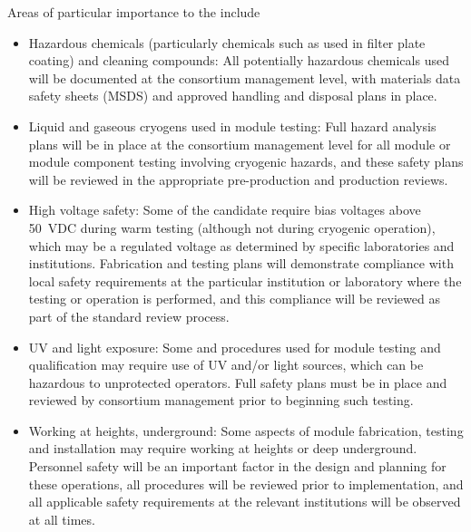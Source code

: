 Areas of particular importance to the  include
\begin{itemize}
\item Hazardous chemicals (particularly  chemicals such as  used in filter plate coating) and cleaning compounds:  All potentially hazardous chemicals used will be documented at the consortium management level, with materials data safety sheets (MSDS) and approved handling and disposal plans in place.

\item Liquid and gaseous cryogens used in module testing:  Full hazard analysis plans will be in place at the consortium management level for all module or module component testing involving cryogenic hazards, and these safety plans will be reviewed in the appropriate pre-production and production reviews.

\item High voltage safety:  Some of the candidate  require bias voltages above \SI{50}{VDC} during warm testing (although not during cryogenic operation), which may be a regulated voltage as determined by specific laboratories and institutions.  Fabrication and testing plans will demonstrate compliance with local  safety requirements at the particular institution or laboratory where the testing or operation is performed, and this compliance will be reviewed as part of the standard review process.

\item UV and  light exposure:  Some  and  procedures used for module testing and qualification may require use of UV and/or  light sources, which can be hazardous  to unprotected operators.  Full safety plans must be in place and reviewed by consortium management prior to beginning such testing.

\item Working at heights, underground:  Some aspects of  module fabrication, testing and installation may require working at heights or deep underground. Personnel safety will be an important factor in the design and planning for these operations, all procedures will be reviewed prior to implementation, and all applicable safety requirements at the relevant institutions will be observed at all times.
%

\end{itemize}
